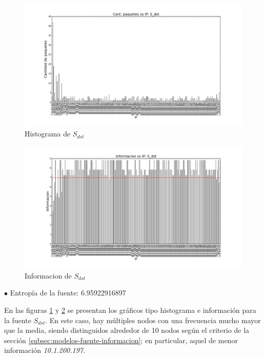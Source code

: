 \begin{figure}[H]\centering
    \includegraphics[width=\linewidth]{../imgs/red-entrepiso-dc_S_dst_hist.png}
    \caption{Histograma de $S_{dst}$}\label{fig:entrepiso-dc-dst-hist}
\end{figure}

\begin{figure}[H]\centering
    \includegraphics[width=\linewidth]{../imgs/red-entrepiso-dc_S_dst_info.png}
    \caption{Informacion de $S_{dst}$}\label{fig:entrepiso-dc-dst-info}
\end{figure}

$\bullet$ Entropía de la fuente: 6.95922916897

En las figuras \ref{fig:entrepiso-dc-dst-hist} y \ref{fig:entrepiso-dc-dst-info} se presentan los gráficos tipo histograma e información para la fuente $S_{dst}$. En este caso, hay múltiples nodos con una frecuencia mucho mayor que la media, siendo distinguidos alrededor de 10 nodos según el criterio de la sección \ref{subsec:modelos-fuente-informacion}; en particular, aquel de menor información \emph{10.1.200.197}.

